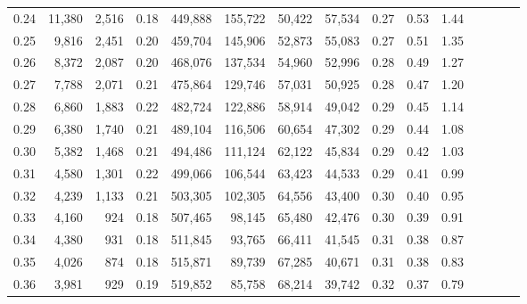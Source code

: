 \begin{tabular}{rrrcrrrrrrrrrrr}
0.24 &  11,380 &  2,516 &                                       0.18 &  449,888 &  155,722 &   50,422 &   57,534 &  0.27 &  0.53 &                         1.44 \\
0.25 &   9,816 &  2,451 &                                       0.20 &  459,704 &  145,906 &   52,873 &   55,083 &  0.27 &  0.51 &                         1.35 \\
0.26 &   8,372 &  2,087 &                                       0.20 &  468,076 &  137,534 &   54,960 &   52,996 &  0.28 &  0.49 &                         1.27 \\
0.27 &   7,788 &  2,071 &                                       0.21 &  475,864 &  129,746 &   57,031 &   50,925 &  0.28 &  0.47 &                         1.20 \\
0.28 &   6,860 &  1,883 &                                       0.22 &  482,724 &  122,886 &   58,914 &   49,042 &  0.29 &  0.45 &                         1.14 \\
0.29 &   6,380 &  1,740 &                                       0.21 &  489,104 &  116,506 &   60,654 &   47,302 &  0.29 &  0.44 &                         1.08 \\
0.30 &   5,382 &  1,468 &                                       0.21 &  494,486 &  111,124 &   62,122 &   45,834 &  0.29 &  0.42 &                         1.03 \\
0.31 &   4,580 &  1,301 &                                       0.22 &  499,066 &  106,544 &   63,423 &   44,533 &  0.29 &  0.41 &                         0.99 \\
0.32 &   4,239 &  1,133 &                                       0.21 &  503,305 &  102,305 &   64,556 &   43,400 &  0.30 &  0.40 &                         0.95 \\
0.33 &   4,160 &    924 &                                       0.18 &  507,465 &   98,145 &   65,480 &   42,476 &  0.30 &  0.39 &                         0.91 \\
0.34 &   4,380 &    931 &                                       0.18 &  511,845 &   93,765 &   66,411 &   41,545 &  0.31 &  0.38 &                         0.87 \\
0.35 &   4,026 &    874 &                                       0.18 &  515,871 &   89,739 &   67,285 &   40,671 &  0.31 &  0.38 &                         0.83 \\
0.36 &   3,981 &    929 &                                       0.19 &  519,852 &   85,758 &   68,214 &   39,742 &  0.32 &  0.37 &                         0.79 \\

\end{tabular}

